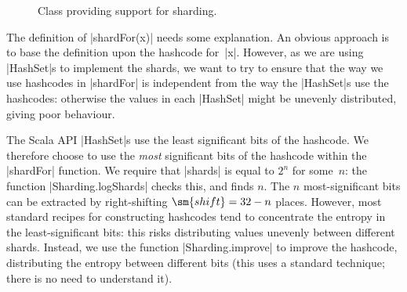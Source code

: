 \begin{figure}
\caption{Class providing support for sharding.}
\label{fig:Sharding}
\end{figure}


The definition of |shardFor(x)| needs some explanation.  An obvious approach
is to base the definition upon the hashcode for~|x|.  However, as we are using
|HashSet|s to implement the shards, we want to try to ensure that the way we
use hashcodes in |shardFor| is independent from the way the |HashSet|s use the
hashcodes: otherwise the values in each |HashSet| might be unevenly
distributed, giving poor behaviour.

The Scala API |HashSet|s use the least significant bits of the hashcode.  We
therefore choose to use the \emph{most} significant bits of the hashcode
within the |shardFor| function.  We require that |shards| is equal to $2^n$
for some~$n$: the function |Sharding.logShards| checks this, and finds $n$.
The $n$ most-significant bits can be extracted by right-shifting $\sm{shift} =
32-n$ places.  However, most standard recipes for constructing hashcodes tend
to concentrate the entropy in the least-significant bits: this risks
distributing values unevenly between different shards.  Instead, we use the
function |Sharding.improve| to improve the hashcode, distributing the entropy
between different bits (this uses a standard technique; there is no need to
understand it).

